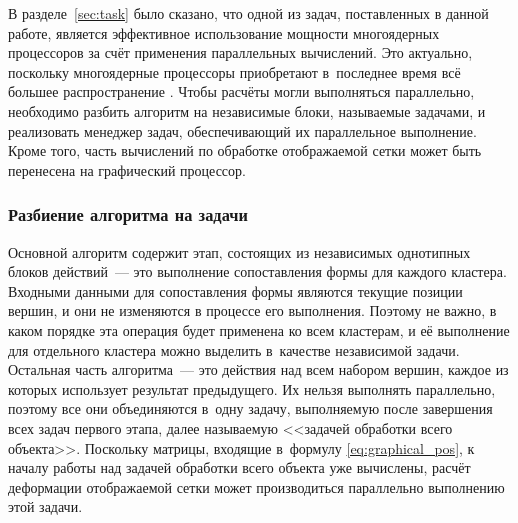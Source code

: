 \documentclass[a4paper, 14pt, titlepage]{extarticle}
\begin{document}
      В разделе~\ref{sec:task} было сказано, что одной из задач, поставленных в данной работе, является эффективное использование
      мощности многоядерных процессоров за счёт применения параллельных вычислений.
      Это актуально, поскольку многоядерные процессоры
      приобретают в~последнее время всё большее распространение \cite{steam-hardware}.
      Чтобы расчёты могли выполняться параллельно, необходимо разбить алгоритм на независимые
      блоки, называемые задачами, и реализовать менеджер задач, обеспечивающий их параллельное
      выполнение. Кроме того, часть вычислений по обработке отображаемой сетки может быть перенесена
      на графический процессор.

      \subsubsection{Разбиение алгоритма на задачи}\label{sssec:parallel_tasks}

        Основной алгоритм содержит этап, состоящих из независимых однотипных блоков
        действий~--- это выполнение сопоставления формы для каждого кластера. Входными данными для
        сопоставления формы являются текущие позиции вершин, и они не изменяются в процессе
        его выполнения. Поэтому не важно, в каком порядке эта операция будет применена ко всем
        кластерам, и её выполнение для отдельного кластера можно выделить в~качестве независимой задачи. Остальная
        часть алгоритма~--- это действия над всем набором вершин, каждое из которых использует
        результат предыдущего. Их нельзя выполнять параллельно, поэтому все они объединяются в~одну
        задачу, выполняемую после завершения всех задач первого этапа, далее называемую <<задачей
        обработки всего объекта>>. Поскольку матрицы, входящие
        в~формулу \eqref{eq:graphical_pos}, к началу работы над задачей обработки всего объекта уже вычислены,
        расчёт деформации отображаемой сетки может производиться параллельно выполнению этой задачи.
\end{document}
